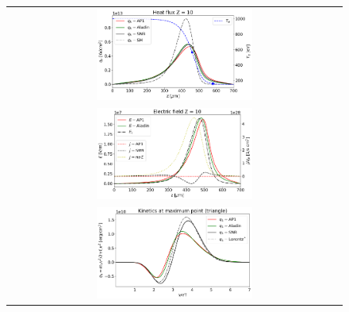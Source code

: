 \documentclass[
 aps,
 jmp,
 amsmath,amssymb,
 twocolumn,
]{revtex4-1}
\newcommand{\figscale}{0.48}
\begin{document}
\begin{figure}[htb]
  \begin{center}
    \begin{tabular}{c}
      \includegraphics[width=\figscale\textwidth]{C7_Aladin_case3_heatflux.png} \\
      \includegraphics[width=\figscale\textwidth]{C7_Aladin_case3_Efield.png} \\
      \includegraphics[width=\figscale\textwidth]{C7_Aladin_case3_kinetics.png} \\

\end{tabular}
\end{center}
\end{figure}
\end{document}
